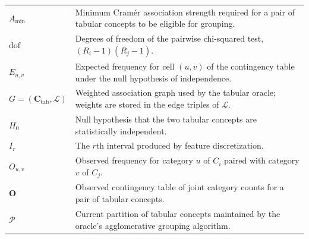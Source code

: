 \begin{longtable}{@{}>{\raggedright\arraybackslash}p{} p{}@{}}
	$A_{\min}$                                         & Minimum Cram\'er association strength required for a pair of tabular concepts to be eligible for grouping.                                                                                            \\
	$\mathrm{dof}$                                     & Degrees of freedom of the pairwise chi-squared test, $(R_i-1)(R_j-1)$.                                                                                                                                \\
	$E_{u,v}$                                          & Expected frequency for cell $(u,v)$ of the contingency table under the null hypothesis of independence.                                                                                               \\
	$G=(\mathbf{C}_{\mathrm{tab}},\mathcal{L})$        & Weighted association graph used by the tabular oracle; weights are stored in the edge triples of $\mathcal{L}$.                                                                                       \\
	$H_0$                                              & Null hypothesis that the two tabular concepts are statistically independent.                                                                                                                          \\
	$I_r$                                              & The $r$th interval produced by feature discretization.                                                                                                                                                \\
	$O_{u,v}$                                          & Observed frequency for category $u$ of $C_i$ paired with category $v$ of $C_j$.                                                                                                                       \\
	$\mathbf{O}$                                       & Observed contingency table of joint category counts for a pair of tabular concepts.                                                                                                                   \\
	$\mathcal{P}$                                      & Current partition of tabular concepts maintained by the oracle's agglomerative grouping algorithm.                                                                                                    \\

\end{longtable}
